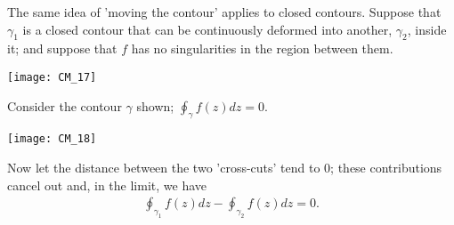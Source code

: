 \documentclass[a4paper]{article}
\begin{document}
The same idea of 'moving the contour' applies to closed contours. Suppose that $\gamma_1$ is a closed contour that can be continuously deformed into another, $\gamma_2$, inside it; and suppose that $f$ has no singularities in the region between them.

\texttt{[image: CM\_17]}

Consider the contour $\gamma$ shown; $\oint_\gamma f(z) dz = 0$.

\texttt{[image: CM\_18]}

Now let the distance between the two 'cross-cuts' tend to 0; these contributions cancel out and, in the limit, we have
\begin{equation*}
\begin{aligned}
\oint_{\gamma_1} f(z) dz - \oint_{\gamma_2}f(z) dz = 0.
\end{aligned}
\end{equation*}
\end{document}
